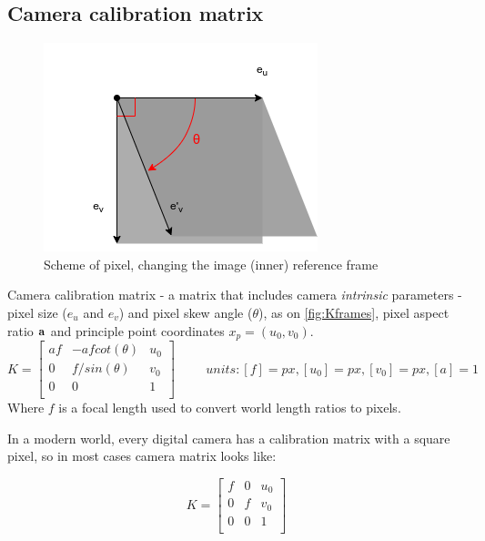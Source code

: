 \subsection{Camera calibration matrix}
\begin{figure}[h]
    \centering
    \includegraphics[width=.6\textwidth]{graphics/pixel.png}
    \caption{Scheme of pixel, changing the image (inner) reference frame}
    \label{fig:Kframes}
\end{figure}
Camera calibration matrix - a matrix that includes camera \textit{intrinsic} parameters - pixel size ($e_u$ and $e_v$) and pixel skew angle ($\theta$), as on \autoref{fig:Kframes}, pixel aspect ratio $\bf{a}$ and principle point coordinates $x_p = (u_0, v_0)$.
$$
K = \begin{bmatrix}
    af & -a f cot(\theta) & u_0 \\
    0 & f / sin(\theta) & v_0 \\
    0 & 0 & 1 \\
\end{bmatrix} \hspace{1cm} units: [f]=px, [u_0]=px, [v_0]=px, [a]=1
$$ 
Where $f$ is a focal length used to convert world length ratios to pixels.

In a modern world, every digital camera has a calibration matrix with a square pixel, so in most cases camera matrix looks like:

$$
K = \begin{bmatrix}
    f & 0 & u_0 \\
    0 & f & v_0 \\
    0 & 0 & 1 \\
\end{bmatrix}
$$

